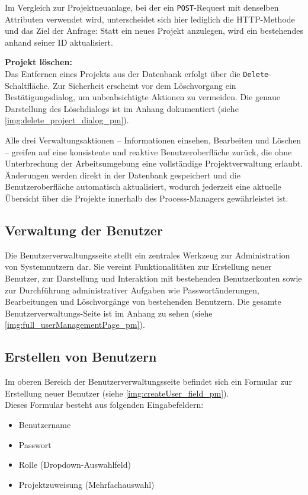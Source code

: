 
Im Vergleich zur Projektneuanlage, bei der ein \texttt{POST}-Request mit denselben Attributen verwendet wird, unterscheidet sich hier lediglich die HTTP-Methode und das Ziel der Anfrage: Statt ein neues Projekt anzulegen, wird ein bestehendes anhand seiner ID aktualisiert.

\textbf{Projekt löschen:}\\
Das Entfernen eines Projekts aus der Datenbank erfolgt über die \texttt{Delete}-Schaltfläche. Zur Sicherheit erscheint vor dem Löschvorgang ein Bestätigungsdialog, um unbeabsichtigte Aktionen zu vermeiden. Die genaue Darstellung des Löschdialogs ist im Anhang dokumentiert (siehe \autoref{img:delete_project_dialog_pm}).

Alle drei Verwaltungsaktionen – Informationen einsehen, Bearbeiten und Löschen – greifen auf eine konsistente und reaktive Benutzeroberfläche zurück, die ohne Unterbrechung der Arbeitsumgebung eine vollständige Projektverwaltung erlaubt. Änderungen werden direkt in der Datenbank gespeichert und die Benutzeroberfläche automatisch aktualisiert, wodurch jederzeit eine aktuelle Übersicht über die Projekte innerhalb des Process-Managers gewährleistet ist.






\newpage
\subsection{Verwaltung der Benutzer}
Die Benutzerverwaltungsseite stellt ein zentrales Werkzeug zur Administration von Systemnutzern dar. Sie vereint Funktionalitäten zur Erstellung neuer Benutzer, zur Darstellung und Interaktion mit bestehenden Benutzerkonten sowie zur Durchführung administrativer Aufgaben wie Passwortänderungen, Bearbeitungen und Löschvorgänge von bestehenden Benutzern. Die gesamte Benutzerverwaltungs-Seite ist im Anhang zu sehen (siehe \autoref{img:full_userManagementPage_pm}).

\subsection*{Erstellen von Benutzern}

Im oberen Bereich der Benutzerverwaltungsseite befindet sich ein Formular zur Erstellung neuer Benutzer (siehe \autoref{img:createUser_field_pm}).\\
Dieses Formular besteht aus folgenden Eingabefeldern:
\begin{itemize}
  \item Benutzername
  \item Passwort
  \item Rolle (Dropdown-Auswahlfeld)
  \item Projektzuweisung (Mehrfachauswahl)
\end{itemize}

